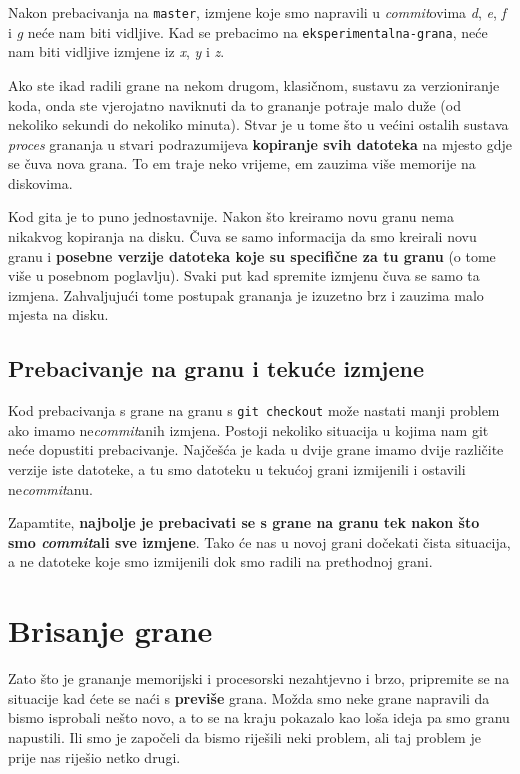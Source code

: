 Nakon prebacivanja na \verb+master+, izmjene koje smo napravili u \emph{commit}ovima \emph d, \emph e, \emph f i \emph g neće nam biti vidljive.
Kad se prebacimo na \verb+eksperimentalna-grana+, neće nam biti vidljive izmjene iz \emph x, \emph y i \emph z.

Ako ste ikad radili grane na nekom drugom, klasičnom, sustavu za verzioniranje koda, onda ste vjerojatno naviknuti da to grananje potraje malo duže (od nekoliko sekundi do nekoliko minuta).
Stvar je u tome što u većini ostalih sustava \emph{proces} grananja u stvari podrazumijeva \textbf{kopiranje svih datoteka} na mjesto gdje se čuva nova grana.
To em traje neko vrijeme, em zauzima više memorije na diskovima.

Kod gita je to puno jednostavnije. Nakon što kreiramo novu granu nema nikakvog kopiranja na disku. 
Čuva se samo informacija da smo kreirali novu granu i \textbf{posebne verzije datoteka koje su specifične za tu granu} (o tome više u posebnom poglavlju).
Svaki put kad spremite izmjenu čuva se samo ta izmjena.
Zahvaljujući tome postupak grananja je izuzetno brz i zauzima malo mjesta na disku.

\subsection*{Prebacivanje na granu i tekuće izmjene}

Kod prebacivanja s grane na granu s \verb+git checkout+ može nastati manji problem ako imamo ne\emph{commit}anih izmjena.
Postoji nekoliko situacija u kojima nam git neće dopustiti prebacivanje.
Najčešća je kada u dvije grane imamo dvije različite verzije iste datoteke, a tu smo datoteku u tekućoj grani izmijenili i ostavili ne\emph{commit}anu.

Zapamtite, \textbf{najbolje je prebacivati se s grane na granu tek nakon što smo \emph{commit}ali sve izmjene}. Tako će nas u novoj grani dočekati čista situacija, a ne datoteke koje smo izmijenili dok smo radili na prethodnoj grani. 

\section*{Brisanje grane}

Zato što je grananje memorijski i procesorski nezahtjevno i brzo, pripremite se na situacije kad ćete se naći s \textbf{previše} grana.
Možda smo neke grane napravili da bismo isprobali nešto novo, a to se na kraju pokazalo kao loša ideja pa smo granu napustili.
Ili smo je započeli da bismo riješili neki problem, ali taj problem je prije nas riješio netko drugi.


